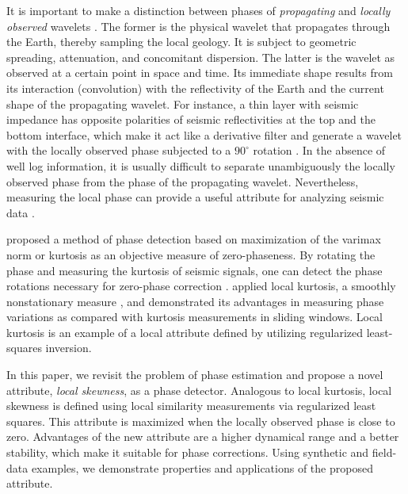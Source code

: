 It is important to make a distinction between phases of
\emph{propagating} and \emph{locally observed} wavelets
\cite[]{mirko3,mirko4}. The former is the physical wavelet that propagates
through the Earth, thereby sampling the local geology. It is subject
to geometric spreading,
attenuation, and concomitant dispersion. The
latter is the wavelet as observed at a certain point in space and
time. Its immediate shape results from its interaction (convolution)
with the reflectivity of the Earth and the current shape of the
propagating wavelet. For instance, a thin layer with
  seismic impedance has opposite polarities of seismic
reflectivities at the top and the bottom interface, which make it act
like a derivative filter and generate a wavelet with the locally
observed phase subjected to a $90^{\circ}$ rotation
\cite[]{GEO70-03-C7C15}. In the absence of well log information, it is
usually difficult to separate unambiguously the locally observed phase
from the phase of the propagating wavelet. Nevertheless, measuring the
local phase can provide a useful attribute for analyzing seismic data
\cite[]{mirko2,envelope,mirko4,pierre}.

\cite{GEO52-01-00510059} proposed a method of phase detection based
on maximization of the varimax norm or kurtosis as an objective
measure of zero-phaseness. By rotating the phase and measuring the
kurtosis of seismic signals, one can detect the phase rotations
necessary for zero-phase correction \cite[]{mirko1}. \cite{mirko2}
applied local kurtosis, a smoothly nonstationary measure
\cite[]{diffr}, and demonstrated its advantages in measuring phase
variations as compared with kurtosis measurements in sliding
windows. Local kurtosis is an example of a local attribute
\cite[]{attr} defined by utilizing regularized least-squares
inversion.

In this paper, we revisit the problem of phase estimation and propose
a novel attribute, \emph{local skewness}, as a phase
detector. Analogous to local kurtosis, local skewness is defined using
local similarity measurements via regularized least squares. This
attribute is maximized when the locally observed phase is close to
zero. Advantages of the new attribute are a higher dynamical range and
a better stability, which make it suitable for   phase corrections. Using synthetic and
field-data examples, we demonstrate properties and applications of the
proposed attribute.

